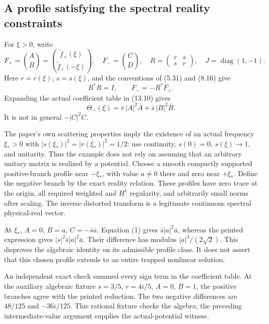 \documentclass[10pt]{article}
\begin{document}
\subsection*{A profile satisfying the spectral reality constraints}
For \(\xi>0\), write \[F_+=\binom{A}{B}=\binom{\widetilde f_+(\xi)}{\widetilde f_+(-\xi)},
 \quad F_-=\binom{C}{D},\quad
 R=\begin{pmatrix}r&s\\s&r\end{pmatrix},\quad
 J=\mathop{\mathrm{diag}}(1,-1).\] Here \(r=r(\xi)\), \(s=s(\xi)\), and the conventions of (5.31) and (8.16) give \[R^*R=I,\qquad F_-=-R^*\overline{F_+}.\] Expanding the actual coefficient table in (13.10) gives \[\Theta_-(\xi)=\bar r\,|A|^2\bar A+
                      \bar s\,|B|^2\bar B .
 \tag{1}\] It is not in general \(-|C|^2C\).\par
The paper’s own scattering properties imply the existence of an actual frequency \(\xi_*>0\) with \(|s(\xi_*)|^2=|r(\xi_*)|^2=1/2\): use continuity, \(s(0)=0\), \(s(\xi)\to1\), and unitarity. Thus the example does not rely on assuming that an arbitrary unitary matrix is realized by a potential. Choose a smooth compactly supported positive-branch profile near \(-\xi_*\), with value \(a\ne0\) there and zero near \(+\xi_*\). Define the negative branch by the exact reality relation. These profiles have zero trace at the origin, all required weighted and \(H^1\) regularity, and arbitrarily small norms after scaling. The inverse distorted transform is a legitimate continuous spectral physical-real vector.\par
At \(\xi_*\), \(A=0\), \(B=a\), \(C=-\bar s\bar a\). Equation (1) gives \(\bar s|a|^2\bar a\), whereas the printed expression gives \(|s|^2\bar s|a|^2\bar a\). Their difference has modulus \(|a|^3/(2\sqrt2)\). This disproves the algebraic identity on its admissible profile class. It does not assert that this chosen profile extends to an entire trapped nonlinear solution.\par
An independent exact check summed every sign term in the coefficient table. At the auxiliary algebraic fixture \(s=3/5\), \(r=4i/5\), \(A=0\), \(B=1\), the positive branches agree with the printed reduction. The two negative differences are \(48/125\) and \(-36i/125\). This rational fixture checks the algebra; the preceding intermediate-value argument supplies the actual-potential witness.\par
\end{document}
